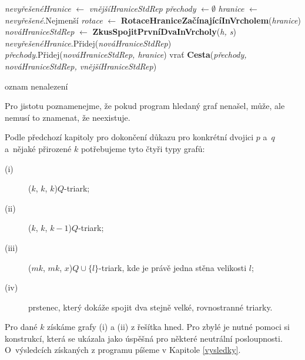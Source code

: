 \begin{algorithm}
\label{alg:Vypln}
\begin{algorithmic}

\State \textit{nevyřešenéHranice} $\gets$ \textit{vnějšíHraniceStdRep}	
\State \textit{přechody} $\gets \emptyset$ 		
 \State \textit{hranice} $\gets$ \textit{nevyřešené}.Nejmenší
\State \textit{rotace} $\gets$ \textbf{RotaceHraniceZačínajícíInVrcholem}(\textit{hranice})
\State	\textit{nováHraniceStdRep} $\gets$ \textbf{ZkusSpojitPrvníDvaInVrcholy}(\textit{h, s}) 	
\State		\textit{nevyřešenéHranice}.Přidej(\textit{nováHraniceStdRep})
\State		\textit{přechody}.Přidej(\textit{nováHraniceStdRep, hranice})
\EndIf
\State		vrať \textbf{Cesta}(\textit{přechody, nováHraniceStdRep, vnějšíHraniceStdRep})
\EndIf

\EndFor
\EndFor
\EndWhile
\State oznam nenalezení
\EndProcedure

\end{algorithmic}
\end{algorithm}


Pro jistotu poznamenejme, že pokud program hledaný graf nenašel, může, ale nemusí to znamenat, že neexistuje.


\bigskip

Podle předchozí kapitoly pro dokončení důkazu pro konkrétní dvojici $p$ a~$q$ a~nějaké přirozené $k$ potřebujeme tyto čtyři typy grafů:
\begin{description}
\item[(i)] ($k$, $k$, $k$)$Q$-triark;
\item[(ii)] ($k$, $k$, $k-1$)$Q$-triark;
\item[(iii)] ($mk$, $mk$, $x$)$Q\cup \lbrace l\rbrace$-triark, kde je právě jedna stěna velikosti $l$;
\item[(iv)] prstenec, který dokáže spojit dva stejně velké, rovnostranné triarky.
\end{description}

Pro dané $k$ získáme grafy (i) a (ii) z řešítka hned. Pro zbylé je nutné pomoci si konstrukcí, která se ukázala jako úspěšná pro některé neutrální posloupnosti. O~výsledcích získaných z programu píšeme v Kapitole \ref{vysledky}.

